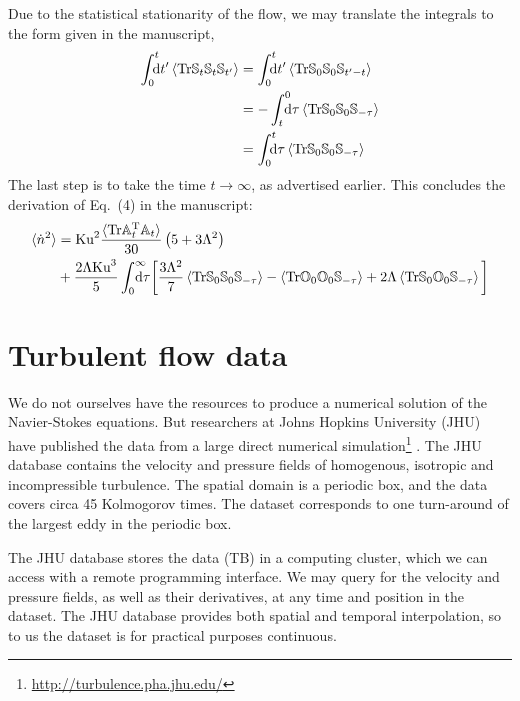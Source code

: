 \documentclass[thesis.tex]{subfiles}
\begin{document}
Due to the statistical stationarity of the flow, we may translate the integrals to the form given in the manuscript, 
\begin{align*}
	\int_0^{t}\!\!\!\!{\rm d}t'\left\langle\tr \ma S_t\ma S_{t}\ma S_{t'}\right\rangle 
	&= \int_0^{t}\!\!\!\!{\rm d}t'\left\langle\tr \ma S_0\ma S_{0}\ma S_{t'-t}\right\rangle \\
	&= -\int_t^{0}\!\!\!\!{\rm d}\tau\left\langle\tr \ma S_0\ma S_{0}\ma S_{-\tau}\right\rangle \\
	&= \int_0^{t}\!\!\!\!{\rm d}\tau\left\langle\tr \ma S_0\ma S_{0}\ma S_{-\tau}\right\rangle
\end{align*}
The last step is to take the time $t\to\infty$, as advertised earlier. This concludes the derivation of Eq.~(4) in the manuscript:
\begin{align}
\langle \dot n^2\rangle &=\ku^2\frac{\langle\tr\ma A_t\transpose \ma A_t\rangle}{30}\left(5 + 3 \Lambda^2\right) \nn \\
	&+ \frac{2 \Lambda\ku^3}{5} \int_0^{\infty}\!\!\!\!\!\!{\rm d}\tau \bigg[\frac{3 \Lambda^2}{7}\left\langle\tr \ma S_0\ma S_{0}\ma S_{-\tau}\right\rangle - \left\langle\tr \ma O_0\ma O_{0}\ma S_{-\tau}\right\rangle + 2 \Lambda\left\langle\tr \ma S_0\ma O_{0}\ma S_{-\tau}\right\rangle\bigg]\eqnlab{eq4final}
\end{align}


\section{Turbulent flow data}

We do not ourselves have the resources to produce a numerical solution of the Navier-Stokes equations. But researchers at Johns Hopkins University (JHU) have published the data from a large direct numerical simulation\footnote{\url{http://turbulence.pha.jhu.edu/}} \cite{li2008}. The JHU database contains the velocity and pressure fields of homogenous, isotropic and incompressible turbulence. The spatial domain is a periodic box, and the data covers circa 45 Kolmogorov times. The dataset corresponds to one turn-around of the largest eddy in the periodic box. 

The JHU database stores the data (\unit[27]{TB}) in a computing cluster, which we can access with a remote programming interface. We may query for the velocity and pressure fields, as well as their derivatives, at any time and position in the dataset. The JHU database provides both spatial and temporal interpolation, so to us the dataset is for practical purposes continuous.
\end{document}
